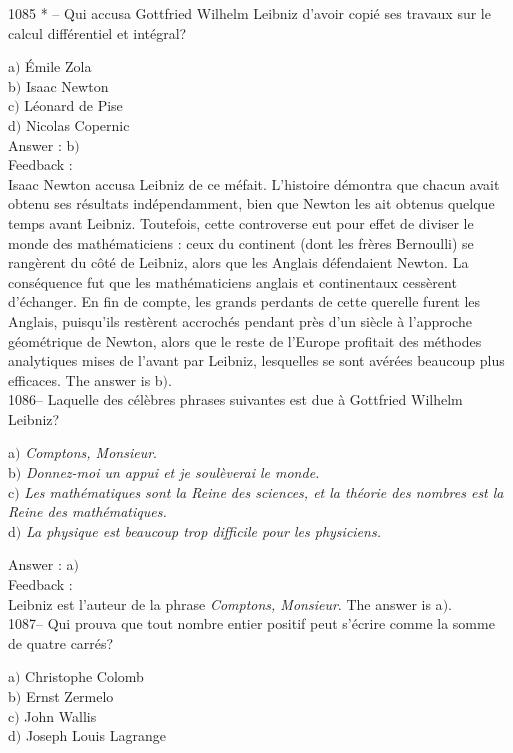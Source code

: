 \documentclass[letterpaper, 12pt]{article}
\begin{document}
1085 * -- Qui accusa Gottfried Wilhelm Leibniz d'avoir copi\'e ses
travaux sur le calcul diff\'erentiel et int\'egral?

a$)$ \'Emile Zola \\
b$)$ Isaac Newton \\
c$)$ L\'eonard de Pise \\
d$)$ Nicolas Copernic  \\

Answer : b$)$\\

Feedback : \\
Isaac Newton accusa Leibniz de ce m\'efait. L'histoire d\'emontra
que chacun avait obtenu ses r\'esultats ind\'ependam\-ment, bien que
Newton les ait obtenus quelque temps avant Leibniz. Toutefois, cette
controverse eut pour effet de diviser le monde des math\'ematiciens
: ceux du continent (dont les fr\`eres Bernoulli) se rang\`erent du
c\^ot\'e de Leibniz, alors que les Anglais d\'efendaient Newton. La
cons\'equence fut que les math\'ematiciens anglais et continentaux
cess\`erent d'\'echanger. En fin de compte, les grands perdants de
cette querelle furent les Anglais, puisqu'ils rest\`erent
accroch\'es pendant pr\`es d'un si\`ecle \`a l'approche
g\'eom\'etrique de Newton, alors que le reste de l'Europe profitait
des m\'ethodes analytiques mises de l'avant par Leibniz, lesquelles
se sont av\'er\'ees beaucoup plus efficaces.
The answer is b$)$.\\

1086-- Laquelle des c\'el\`ebres phrases suivantes est due \`a
Gottfried Wilhelm Leibniz?

a$)$ {\sl Comptons, Monsieur}. \\
b$)$ {\sl Donnez-moi un appui et je soul\`everai le monde.} \\
c$)$ {\sl Les math\'ematiques sont la Reine des sciences, et la th\'eorie
des nombres est la Reine des math\'ematiques.} \\
d$)$ {\sl La physique est beaucoup trop difficile pour les physiciens.}

Answer : a$)$\\

Feedback : \\
Leibniz est l'auteur de la phrase {\sl Comptons, Monsieur}.
The answer is a$)$.\\

1087-- Qui prouva que tout nombre entier positif peut s'\'ecrire
comme la somme de quatre carr\'es?

a$)$ Christophe Colomb \\
b$)$ Ernst Zermelo \\
c$)$ John Wallis \\
d$)$ Joseph Louis Lagrange\\
\end{document}
